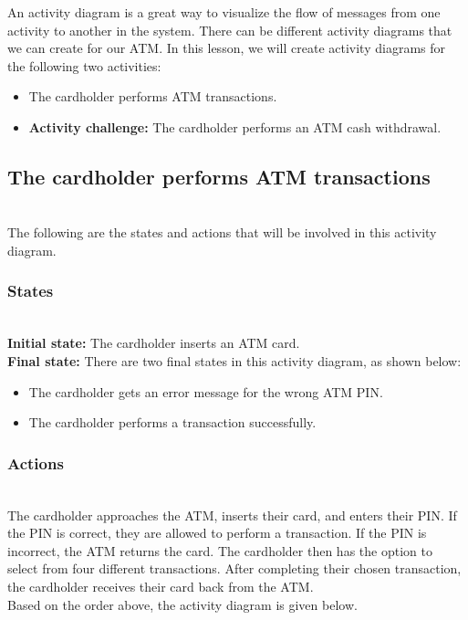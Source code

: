 

An activity diagram is a great way to visualize the flow of messages from one activity to another in the system. There can be different activity diagrams that we can create for our ATM. In this lesson, we will create activity diagrams for the following two activities:

\begin{itemize}
\item
\protect{}\label{Cn-VTcJNKhQobLUBcI-pf}
The cardholder performs ATM transactions.
\item
\protect{}\label{RLQ7b-5UKsgGVn0stF0Ok}
\textbf{Activity challenge:} The cardholder performs an ATM cash withdrawal.
\end{itemize}

\subsection{The cardholder performs ATM transactions}\label{p4eCgzvofVQJaFhh9nCSl}
\\
The following are the states and actions that will be involved in this activity diagram.

\subsubsection{States}\label{9Ew2rOaJHR_K2F242eREK}
\\
\textbf{Initial state:} The cardholder inserts an ATM card.
\\
\textbf{Final state:} There are two final states in this activity diagram, as shown below:

\begin{itemize}
\item
\protect{}\label{mn5-QaWSMDGeSwwfpM70r}
The cardholder gets an error message for the wrong ATM PIN.
\item
\protect{}\label{-C8pcPQzpwEBim4CGrLUo}
The cardholder performs a transaction successfully.
\end{itemize}

\subsubsection{Actions}\label{ZzXFrbQma6YNQEvQBl6Wy}
\\
The cardholder approaches the ATM, inserts their card, and enters their PIN. If the PIN is correct, they are allowed to perform a transaction. If the PIN is incorrect, the ATM returns the card. The cardholder then has the option to select from four different transactions. After completing their chosen transaction, the cardholder receives their card back from the ATM.
\\
Based on the order above, the activity diagram is given below.

